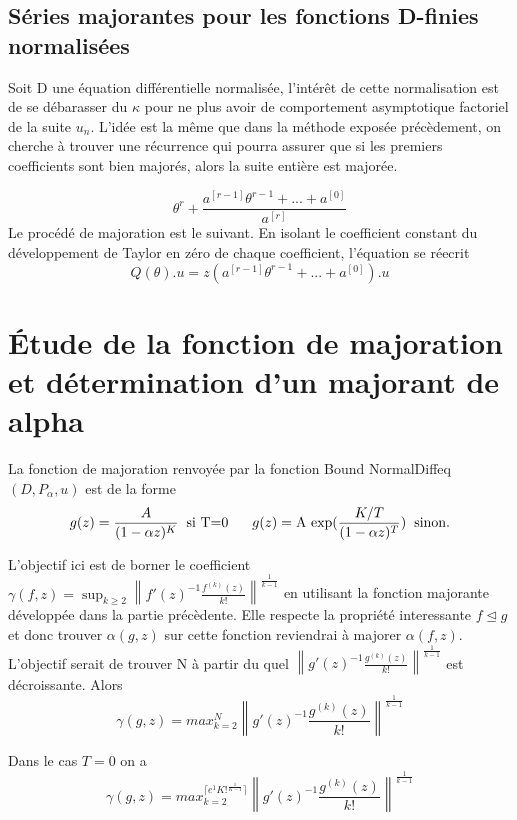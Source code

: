 \documentclass[a4paper,10.5pt]{article}
\begin{document}
	\subsection{Séries majorantes pour les fonctions D-finies normalisées}
	
	Soit D une équation différentielle normalisée, l'intérêt de cette normalisation est de se débarasser du $\kappa$ pour ne plus avoir de comportement asymptotique factoriel de la suite $u_n$. L'idée est la même que dans la méthode exposée précèdement, on cherche à trouver une récurrence qui pourra assurer que si les premiers coefficients sont bien majorés, alors la suite entière est majorée.
	
	\[\theta^{r}+\frac{a^{[r-1]}\theta^{r-1}+...+a^{[0]}}{a^{[r]}}\]
	Le procédé de majoration est le suivant. En isolant le coefficient constant du développement de Taylor en zéro de chaque coefficient, l'équation se réecrit
	\[Q(\theta).u=z(a^{[r-1]}\theta^{r-1}+...+a^{[0]}).u\]
	
	
	\newpage
	
	
	
	\section{Étude de la fonction de majoration et détermination d'un majorant de alpha}
	La fonction de majoration renvoyée par la fonction Bound NormalDiffeq$(D,P_{\alpha},u)$  est de la  forme
	\[g(z)=\frac{A}{(1-\alpha z)^{K}} \hspace{2mm}\text{si T=0}\hspace{6mm} g(z)=\text{A exp}(\frac{K/T}{(1-\alpha z)^{T}}) \hspace{2mm} \text{sinon.} \]
	
	\noindent L'objectif ici est de borner le coefficient $\gamma(f,z)=\sup_{k \geq 2} \left\|f'(z)^{-1}\frac{f^{(k)}(z)}{k!}\right\|^{\frac{1}{k-1}}$ en utilisant la fonction majorante développée dans la partie précèdente. Elle respecte la propriété interessante $f\unlhd g$ et donc trouver $\alpha(g,z)$ sur cette fonction reviendrai à majorer $\alpha(f,z)$. L'objectif serait de trouver N à partir du quel $\left\|g'(z)^{-1}\frac{g^{(k)}(z)}{k!}\right\|^{\frac{1}{k-1}}$ est décroissante. Alors 
	\[\gamma(g,z)=max_{k=2}^{N}\left\|g'(z)^{-1}\frac{g^{(k)}(z)}{k!}\right\|^{\frac{1}{k-1}}\] 
	
	\begin{proposition} Dans le cas $T=0$ on a \[\gamma(g,z)=max_{k=2}^{\lceil e^{1}K!^{\frac{1}{K-1}} \rceil}\left\|g'(z)^{-1}\frac{g^{(k)}(z)}{k!}\right\|^{\frac{1}{k-1}}\]
	\end{proposition}
\end{document}

